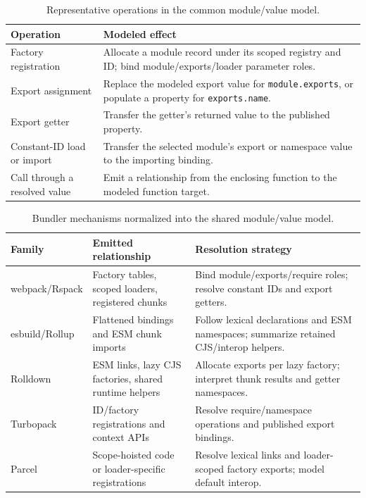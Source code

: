 \begin{table}[htbp]
\caption{Representative operations in the common module/value model.}
\label{tab:module-operations}
\centering\small
\begin{tabular}{@{}p{.29\linewidth}p{.65\linewidth}@{}}
\toprule
Operation & Modeled effect\\
\midrule
Factory registration & Allocate a module record under its scoped registry and ID; bind module/exports/loader parameter roles.\\
\addlinespace
Export assignment & Replace the modeled export value for \texttt{module.exports}, or populate a property for \texttt{exports.name}.\\
\addlinespace
Export getter & Transfer the getter's returned value to the published property.\\
\addlinespace
Constant-ID load or import & Transfer the selected module's export or namespace value to the importing binding.\\
\addlinespace
Call through a resolved value & Emit a relationship from the enclosing function to the modeled function target.\\
\bottomrule
\end{tabular}
\end{table}

\begin{table}[htbp]
\caption{Bundler mechanisms normalized into the shared module/value model.}
\label{tab:bundler-mechanisms}
\centering\small
\begin{tabular}{@{}p{.19\linewidth}p{.34\linewidth}p{.39\linewidth}@{}}
\toprule
Family & Emitted relationship & Resolution strategy\\
\midrule
webpack/Rspack & Factory tables, scoped loaders, registered chunks & Bind module/exports/require roles; resolve constant IDs and export getters.\\
\addlinespace
esbuild/Rollup & Flattened bindings and ESM chunk imports & Follow lexical declarations and ESM namespaces; summarize retained CJS/interop helpers.\\
\addlinespace
Rolldown & ESM links, lazy CJS factories, shared runtime helpers & Allocate exports per lazy factory; interpret thunk results and getter namespaces.\\
\addlinespace
Turbopack & ID/factory registrations and context APIs & Resolve require/namespace operations and published export bindings.\\
\addlinespace
Parcel & Scope-hoisted code or loader-specific registrations & Resolve lexical links and loader-scoped factory exports; model default interop.\\
\bottomrule
\end{tabular}
\end{table}

